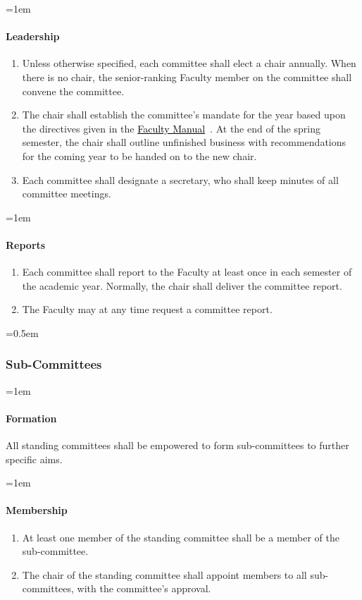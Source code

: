 \documentclass{manual}
\newcommand{\keyword}[1]{\textcolor{black}{#1}}
\newcommand{\facman}{\keyword{\underline{Faculty Manual}}~}
\let\oldsubsubsection\subsubsection
\renewcommand\subsubsection{\leftskip=0.5em\oldsubsubsection}
\let\oldparagraph\paragraph
\renewcommand\paragraph{\leftskip=1em\oldparagraph}
\newcommand{\itemLevelA}{\alph*.}
\newcommand{\itemRefA}{\alph*}
\begin{document}
\paragraph{Leadership}

\begin{enumerate}[label=\itemLevelA,ref=\itemRefA]

\item Unless otherwise specified, each committee shall elect a chair annually. When there is no chair, the senior-ranking Faculty member on the committee shall convene the committee.


\item The chair shall establish the committee's mandate for the year based upon the directives given in the \facman. At the end of the spring semester, the chair shall outline unfinished business with recommendations for the coming year to be handed on to the new chair.


\item Each committee shall designate a secretary, who shall keep minutes of all committee meetings.
\end{enumerate}

\paragraph{Reports}


\begin{enumerate}[label=\itemLevelA,ref=\itemRefA]
\item Each committee shall report to the Faculty at least once in each semester of the academic year. Normally, the chair shall deliver the committee report.


\item The Faculty may at any time request a committee report. 
\end{enumerate}


\subsubsection{Sub-Committees}

\paragraph{Formation}
All standing committees shall be empowered to form sub-committees to further specific aims. 

\paragraph{Membership}
\begin{enumerate}[label=\itemLevelA,ref=\itemRefA]

\item At least one member of the standing committee shall be a member of the sub-committee.


\item The chair of the standing committee shall appoint members to all sub-committees, with the committee's approval.
\end{enumerate}
\end{document}
